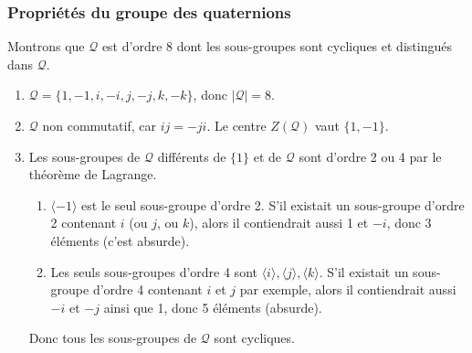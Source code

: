 \documentclass[10pt,notheorems]{beamer}
\theoremstyle{plain}
\theoremstyle{definition}
\theoremstyle{plain}
\theoremstyle{plain}
\theoremstyle{plain}
\theoremstyle{remark}
\begin{document}

\begin{frame}
  \frametitle{Propriétés du groupe des quaternions}
  Montrons que $\mathcal{Q}$ est d'ordre 8 dont les sous-groupes sont cycliques et distingués dans $\mathcal{Q}$.

  \begin{enumerate}
    \item   $\mathcal{Q} = \{ 1, -1, i,-i,j,-j,k,-k \} $, donc $\mid \mathcal{Q} \mid = 8$.
    \item $\mathcal{Q}$ non commutatif, car $ij = -ji$. Le centre $Z(\mathcal{Q})$ vaut $\{ 1, -1 \} $.
    \item Les sous-groupes de $\mathcal{Q}$ différents de $\{ 1 \} $ et de $\mathcal{Q}$ sont d'ordre 2 ou 4 par le théorème de Lagrange.
    \begin{enumerate}
      \item $\langle -1  \rangle $ est le seul sous-groupe d'ordre 2. S'il existait un sous-groupe d'ordre 2 contenant $i$ (ou $j$, ou $k$), alors il contiendrait aussi 1 et $-i$, donc 3 éléments (c'est absurde).
      \item Les seuls sous-groupes d'ordre 4 sont $\langle i \rangle, \langle j \rangle, \langle k \rangle$. S'il existait un sous-groupe d'ordre 4 contenant $i$ et $j$ par exemple, alors il contiendrait aussi $-i$ et $-j$ ainsi que 1, donc 5 éléments (absurde).
    \end{enumerate}
    Donc tous les sous-groupes de $\mathcal{Q}$ sont cycliques.
  \end{enumerate}

\end{frame}
\end{document}
